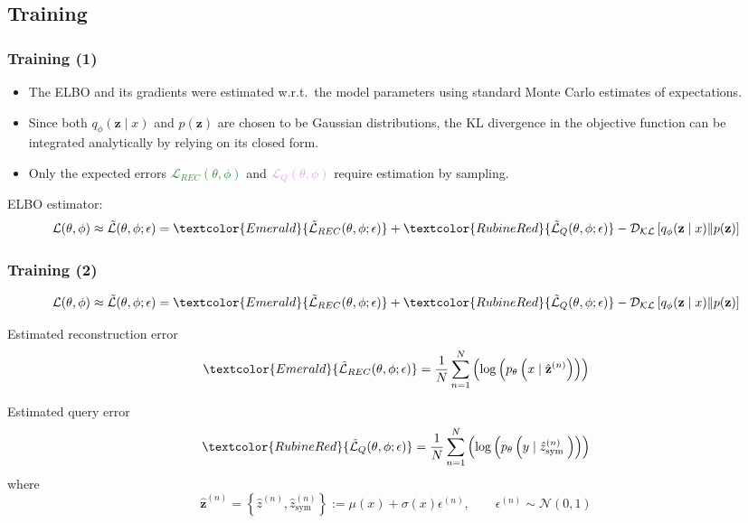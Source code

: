 \documentclass[10pt,xcolor={dvipsnames}]{beamer}
\begin{document}
\begin{frame}
    \subsection{Training}
    \frametitle{Training (1)}
    \begin{itemize}
        \item The ELBO and its gradients were estimated w.r.t.~the model parameters using standard Monte Carlo estimates of expectations.
        \item Since both $q_{\phi}(\mathbf{z} \mid x)$ and $p(\mathbf{z})$ are chosen to be Gaussian distributions, the KL divergence in the objective function can be integrated analytically by relying on its closed form.
        \item Only the expected errors \textcolor{ForestGreen}{$\mathcal{L}_{R E C}(\theta, \phi)$} and \textcolor{Plum}{$\mathcal{L}_{Q}(\theta, \phi)$} require estimation by sampling.
    \end{itemize}\medskip

    \noindent ELBO estimator:
    $$
        \mathcal{L}(\theta, \phi) \approx \tilde{\mathcal{L}}(\theta, \phi ; \epsilon)=
        \textcolor{Emerald}{\tilde{\mathcal{L}}_{R E C}(\theta, \phi ; \epsilon)}+
        \textcolor{RubineRed}{\tilde{\mathcal{L}}_{Q}(\theta, \phi ; \epsilon)}-
        \mathcal{D}_{\mathcal{K} \mathcal{L}}\left[q_{\phi}(\mathbf{z} \mid x) \| p(\mathbf{z})\right]
    $$
\end{frame}


\begin{frame}
    \frametitle{Training (2)}
    $$
        \mathcal{L}(\theta, \phi) \approx \tilde{\mathcal{L}}(\theta, \phi ; \epsilon)=
        \textcolor{Emerald}{\tilde{\mathcal{L}}_{R E C}(\theta, \phi ; \epsilon)}+
        \textcolor{RubineRed}{\tilde{\mathcal{L}}_{Q}(\theta, \phi ; \epsilon)}-
        \mathcal{D}_{\mathcal{K} \mathcal{L}}\left[q_{\phi}(\mathbf{z} \mid x) \| p(\mathbf{z})\right]
    $$

    \textcolor{Emerald}{Estimated reconstruction error}
    $$
        \textcolor{Emerald}{\tilde{\mathcal{L}}_{R E C}(\theta, \phi ; \epsilon)} =
        \frac{1}{N} \sum_{n=1}^{N}\left(\log \left(p_{\theta}\left(x \mid \hat{\mathbf{z}}^{(n)}\right)\right)\right)
    $$

    \textcolor{RubineRed}{Estimated query error}
    $$
        \textcolor{RubineRed}{\tilde{\mathcal{L}}_{Q}(\theta, \phi ; \epsilon)} =
        \frac{1}{N} \sum_{n=1}^{N}\left(\log \left(p_{\theta}\left(y \mid \hat{z}_{\text {sym }}^{(n)}\right)\right)\right)
    $$
    where
    $$
        \hat{\mathbf{z}}^{(n)} =\left\{\hat{z}^{(n)}, \hat{z}_{\text {sym}}^{(n)}\right\}:=\mu(x)+\sigma(x) \epsilon^{(n)} , \qquad
        \epsilon^{(n)} \sim \mathcal{N}(0,1)
    $$
\end{frame}
\end{document}
